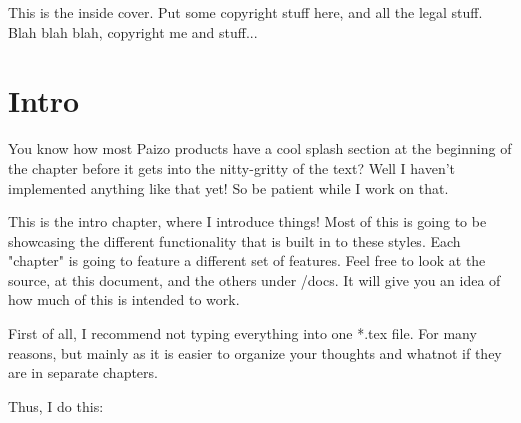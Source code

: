 \documentclass[10pt,letterpaper,onecolumn,openany]{book}
\begin{document}
\frontmatter

\pfMakeCover[
  image = ai-generated-cover-art,
  title = PF2e-\TeX Spellbook,
  subtitle = {Is it a spellbook, or a cheatsheet?} %
]

This is the inside cover.
Put some copyright stuff here, and all the legal stuff.
Blah blah blah, copyright me and stuff...

\lipsum[1-5]


\tableofcontents

\mainmatter

\chapter{Intro}

You know how most Paizo products have a cool splash section at the beginning of the chapter before it gets into the nitty-gritty of the text?
Well I haven't implemented anything like that yet!
So be patient while I work on that.

\begin{multicols}{2}

This is the intro chapter, where I introduce things!
Most of this is going to be showcasing the different functionality that is built in to these styles.
Each "chapter" is going to feature a different set of features.
Feel free to look at the source, at this document, and the others under /docs.
It will give you an idea of how much of this is intended to work.

First of all, I recommend not typing everything into one *.tex file.
For many reasons, but mainly as it is easier to organize your thoughts and whatnot if they are in separate chapters.

Thus, I do this:

\end{multicols}



\end{document}
